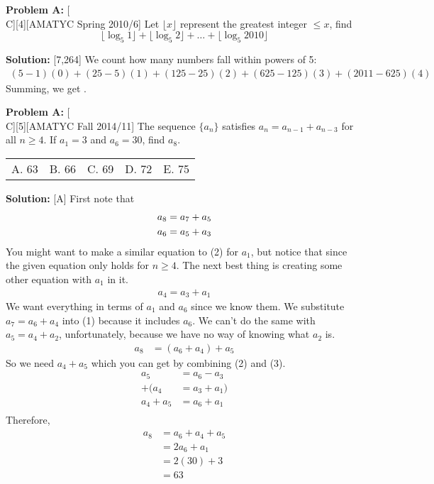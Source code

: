 \documentclass[12pt]{article}
\makeatletter
\newcounter{problem}
\newenvironment{problem}[1]{%
    \stepcounter{problem}
    \noindent\textbf{Problem A\theproblem:} #1
    \\[1em]
}{}
\newcommand{\multChoice}[5]{%
    \begin{tabular}{l @{\hskip 1.5cm} l @{\hskip 1.5cm} l @{\hskip 1.5cm} l @{\hskip 1.5cm} l}
    A. #1 & B. #2 & C. #3 & D. #4 & E. #5
    \end{tabular}
}
\newenvironment{solution}{%
    \vspace{1em}
    \noindent\textbf{Solution:} 
}{}
\makeatother
\begin{document}
\vskip 1cm

\begin{problem}[C][4][AMATYC Spring 2010/6]
    Let $\lfloor x \rfloor$ represent the greatest integer $\leq x$, find 
    $$\lfloor \log_5 1 \rfloor + \lfloor \log_5 2 \rfloor + \ldots + \lfloor \log_5 2010 \rfloor$$
\end{problem}

\begin{solution}[7,264]
    We count how many numbers fall within powers of 5:
    \begin{align*}
        (5-1)(0)+(25-5)(1)+(125-25)(2)+(625-125)(3)+(2011-625)(4)
    \end{align*}
    Summing, we get .
\end{solution}

\vskip 1cm

\begin{problem}[C][5][AMATYC Fall 2014/11]
    The sequence \(\{a_n\}\) satisfies \(a_n = a_{n-1} + a_{n-3}\) for all \(n \geq 4\). If \(a_1 = 3\) and \(a_6 = 30\), find \(a_8\).
   \end{problem}
\multChoice{63}{66}{69}{72}{75}

\begin{solution}[A]
   First note that
   \begin{align} \setcounter{equation}{0}
       a_8 &= a_7 + a_5\\
       a_6 &= a_5 + a_3
   \end{align}
   You might want to make a similar equation to (2) for $a_1$, but notice that since the given equation only holds for $n \geq 4$. The next best thing is creating some other equation with $a_1$ in it.
   \begin{align}
       a_4=a_3+a_1
   \end{align}
   We want everything in terms of $a_1$ and $a_6$ since we know them. We substitute $a_7=a_6+a_4$ into (1) because it includes $a_6$. We can't do the same with $a_5=a_4+a_2$, unfortunately, because we have no way of knowing what $a_2$ is.
   \begin{align}
       a_8 &= (a_6 + a_4) + a_5
   \end{align}
   So we need $a_4 + a_5$ which you can get by combining (2) and (3).
   \begin{align*}
       a_5 &= a_6 - a_3\\
       +(a_4 &= a_3 + a_1)\\
       a_4 + a_5 &= a_6 + a_1\\
   \end{align*}
   Therefore,
   \begin{align*}
       a_8 &= a_6 + a_4 + a_5\\
       &= 2a_6 + a_1\\
       &=2(30)+3\\
       &=\boxed{63}\\
   \end{align*}
\end{solution}
\end{document}

